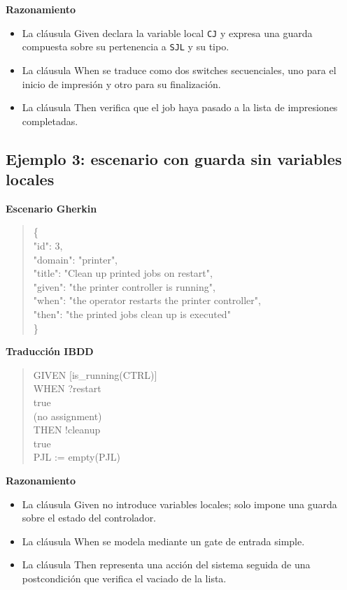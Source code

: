 \textbf{Razonamiento}

\begin{itemize}
\item La cláusula Given declara la variable local \texttt{CJ} y expresa una guarda compuesta sobre su pertenencia a \texttt{SJL} y su tipo.
\item La cláusula When se traduce como dos switches secuenciales, uno para el inicio de impresión y otro para su finalización.
\item La cláusula Then verifica que el job haya pasado a la lista de impresiones completadas.
\end{itemize}

\subsection{Ejemplo 3: escenario con guarda sin variables locales}

\textbf{Escenario Gherkin}

\begin{quote}
\ttfamily\small
\{\\
\quad "id": 3,\\
\quad "domain": "printer",\\
\quad "title": "Clean up printed jobs on restart",\\
\quad "given": "the printer controller is running",\\
\quad "when": "the operator restarts the printer controller",\\
\quad "then": "the printed jobs clean up is executed"\\
\}
\end{quote}

\textbf{Traducción IBDD}

\begin{quote}
\ttfamily\small
GIVEN [is\_running(CTRL)]\\
WHEN ?restart\\
\quad true\\
\quad (no assignment)\\
THEN !cleanup\\
\quad true\\
\quad PJL := empty(PJL)\\
\end{quote}

\textbf{Razonamiento}

\begin{itemize}
\item La cláusula Given no introduce variables locales; solo impone una guarda sobre el estado del controlador.
\item La cláusula When se modela mediante un gate de entrada simple.
\item La cláusula Then representa una acción del sistema seguida de una postcondición que verifica el vaciado de la lista.
\end{itemize}

